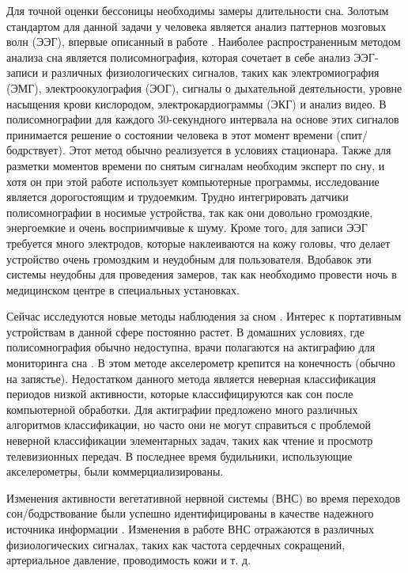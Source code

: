 Для точной оценки бессоницы необходимы замеры длительности сна. Золотым стандартом для данной задачи у человека является анализ паттернов мозговых волн (ЭЭГ), впервые описанный в работе \cite{eeg_for_sleep}. Наиболее распространенным методом анализа сна является полисомнография, которая сочетает в себе анализ ЭЭГ-записи и различных физиологических сигналов, таких как электромиография (ЭМГ), электроокулография (ЭОГ), сигналы о дыхательной деятельности, уровне насыщения крови кислородом, электрокардиограммы (ЭКГ) и анализ видео. В полисомнографии для каждого 30-секундного интервала на основе этих сигналов принимается решение о состоянии человека в этот момент времени (спит/бодрствует). Этот метод обычно реализуется в условиях стационара. Также для разметки моментов времени по снятым сигналам необходим эксперт по сну, и хотя он при этой работе использует компьютерные программы, исследование является дорогостоящим и трудоемким. Трудно интегрировать датчики полисомнографии в носимые устройства, так как они довольно громоздкие, энергоемкие и очень восприимчивые к шуму. Кроме того, для записи ЭЭГ требуется много электродов, которые наклеиваются на кожу головы, что делает устройство очень громоздким и неудобным для пользователя. 
Вдобавок эти системы неудобны для проведения замеров, так как необходимо провести ночь в медицинском центре в специальных установках.

Сейчас исследуются новые методы наблюдения за сном \cite{monitor_sleep, monitor_sleep2, monitor_sleep3}. Интерес к портативным устройствам в данной сфере постоянно растет. В домашних условиях, где полисомнография обычно недоступна, врачи полагаются на актиграфию для мониторинга сна \cite{actigrafia}. В этом методе акселерометр крепится на конечность (обычно на запястье). Недостатком данного метода является неверная классификация периодов низкой активности, которые классифицируются как сон после компьютерной обработки. Для актиграфии предложено много различных алгоритмов классификации, но часто они не могут справиться с проблемой неверной классификации элементарных задач, таких как чтение и просмотр телевизионных передач. В последнее время будильники, использующие акселерометры, были коммерциализированы.

Изменения активности вегетативной нервной системы (ВНС) во время переходов сон/бодрствование были успешно идентифицированы в качестве надежного источника информации \cite{tosleep}. Изменения в работе ВНС отражаются в различных физиологических сигналах, таких как частота сердечных сокращений, артериальное давление, проводимость кожи и т. д. 

